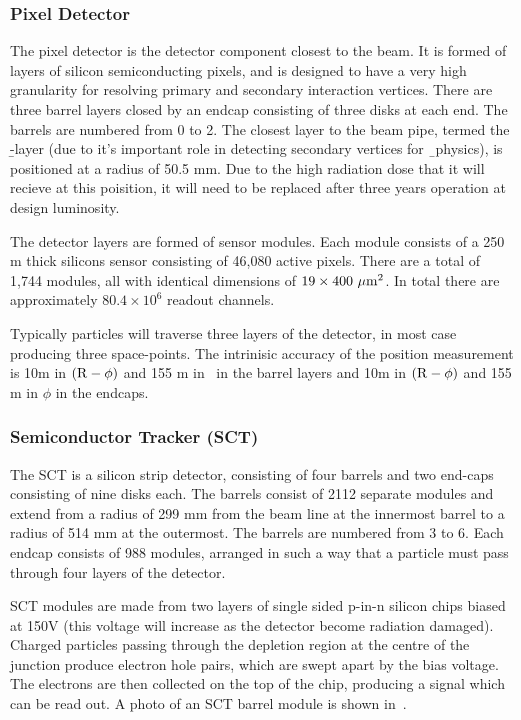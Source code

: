 \subsubsection{Pixel Detector}

The pixel detector is the detector component closest to the beam. It is formed
of layers of silicon semiconducting pixels, and is designed to have a very
high granularity for resolving primary and secondary interaction vertices. There
are three barrel layers closed by an endcap consisting of three disks at each
end. The barrels are numbered from 0 to 2. The closest layer to the beam
pipe, termed the \b-layer (due to it's important role in detecting secondary
vertices for \b\ physics), is
positioned at a radius of 50.5 mm. Due to the high radiation dose that it will
recieve at this poisition, it will need to be replaced after three years
operation at design luminosity.

The detector layers are formed of sensor modules. Each module consists of a 250 \micro m thick
silicons sensor consisting of 46,080 active pixels. There are a total of 1,744
modules, all with identical dimensions of $19\times400~\mu \rm{m}^{2}$. In total
there are approximately $80.4\times 10^{6}$ readout channels.

Typically particles will traverse three layers of the detector, in most case
producing three space-points. The intrinisic accuracy of the position
measurement is 10\micro m in $(\rm{R}-\phi)$ and 155 \micro m in \z\ in the
barrel layers and 10\micro m in $(\rm{R}-\phi)$ and 155 \micro m in $\phi$ in
the endcaps.

\subsubsection{Semiconductor Tracker (SCT)}

\label{sec:Detector-SCT}

The SCT is a silicon strip detector, consisting of four barrels and two end-caps
consisting of nine disks each. The barrels consist of 2112 separate modules and
extend from a radius of 299 mm from the beam line at the innermost barrel to a
radius of 514 mm at the outermost. The barrels are numbered from 3 to 6. Each
endcap consists of 988 modules, arranged in such a way that a particle must pass
through four layers of the detector.

SCT modules are made from two layers of single sided p-in-n silicon chips biased
at 150V (this voltage will increase as the detector become radiation damaged). Charged particles passing through the depletion region at the centre of
the junction produce electron hole pairs, which are swept apart by the bias
voltage. The electrons are then collected on the top of the chip, producing a
signal which can be read out. A photo of an SCT barrel module is shown
in~.

